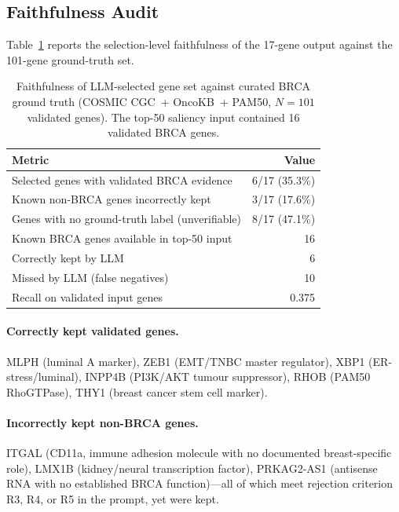 \documentclass{article}
\begin{document}
\subsection{Faithfulness Audit}
\label{sec:faithfulness}

Table~\ref{tab:faithfulness} reports the selection-level faithfulness of
the 17-gene output against the 101-gene ground-truth set.

\begin{table}[h]
\caption{Faithfulness of LLM-selected gene set against curated BRCA
ground truth (COSMIC CGC~+ OncoKB~+ PAM50, $N=101$ validated genes).
The top-50 saliency input contained 16 validated BRCA genes.}
\label{tab:faithfulness}
\vspace{4pt}
\centering
\begin{tabular}{lr}
\toprule
\textbf{Metric} & \textbf{Value} \\
\midrule
Selected genes with validated BRCA evidence & 6/17 (35.3\%) \\
Known non-BRCA genes incorrectly kept & 3/17 (17.6\%) \\
Genes with no ground-truth label (unverifiable) & 8/17 (47.1\%) \\
Known BRCA genes available in top-50 input & 16 \\
Correctly kept by LLM & 6 \\
Missed by LLM (false negatives) & 10 \\
Recall on validated input genes & 0.375 \\
\bottomrule
\end{tabular}
\end{table}

\paragraph{Correctly kept validated genes.}
MLPH (luminal A marker), ZEB1 (EMT/TNBC master regulator),
XBP1 (ER-stress/luminal), INPP4B (PI3K/AKT tumour suppressor),
RHOB (PAM50 RhoGTPase), THY1 (breast cancer stem cell marker).

\paragraph{Incorrectly kept non-BRCA genes.}
ITGAL (CD11a, immune adhesion molecule with no documented breast-specific
role), LMX1B (kidney/neural transcription factor), PRKAG2-AS1 (antisense
RNA with no established BRCA function)---all of which meet rejection
criterion R3, R4, or R5 in the prompt, yet were kept.
\end{document}
